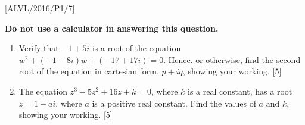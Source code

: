 \item {[}ALVL/2016/P1/7{]}

\textbf{Do not use a calculator in answering this question.} 
\begin{enumerate}
\item Verify that $-1+5i$ is a root of the equation $w^{2}+\left(-1-8i\right)w+\left(-17+17i\right)=0$.
Hence. or otherwise, find the second root of the equation in cartesian
form, $p+iq$, showing your working. \hfill{}{[}5{]}
\item The equation $z^{3}-5z^{2}+16z+k=0$, where $k$ is a real constant,
has a root $z=1+ai$, where $a$ is a positive real constant. Find
the values of $a$ and $k$, showing your working. \hfill{}{[}5{]}
\end{enumerate}
